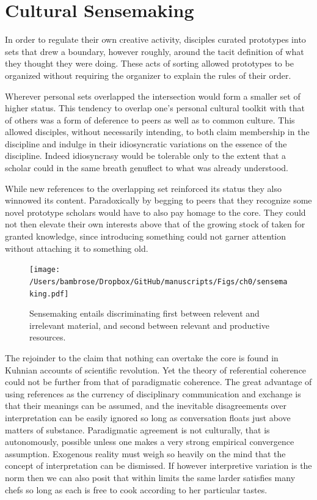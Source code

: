 \documentclass[]{article}
\begin{document}
\section{Cultural Sensemaking}\label{cultural-sensemaking}

In order to regulate their own creative activity, disciples curated
prototypes into sets that drew a boundary, however roughly, around the
tacit definition of what they thought they were doing. These acts of
sorting allowed prototypes to be organized without requiring the
organizer to explain the rules of their order.

Wherever personal sets overlapped the intersection would form a smaller
set of higher status. This tendency to overlap one's personal cultural
toolkit with that of others was a form of deference to peers as well as
to common culture. This allowed disciples, without necessarily
intending, to both claim membership in the discipline and indulge in
their idiosyncratic variations on the essence of the discipline. Indeed
idiosyncrasy would be tolerable only to the extent that a scholar could
in the same breath genuflect to what was already understood.

While new references to the overlapping set reinforced its status they
also winnowed its content. Paradoxically by begging to peers that they
recognize some novel prototype scholars would have to also pay homage to
the core. They could not then elevate their own interests above that of
the growing stock of taken for granted knowledge, since introducing
something could not garner attention without attaching it to something
old.

\begin{figure}[htbp]
\centering
\texttt{[image: /Users/bambrose/Dropbox/GitHub/manuscripts/Figs/ch0/sensemaking.pdf]}
\caption{Sensemaking entails discriminating first between relevent and
irrelevant material, and second between relevant and productive
resources.}
\end{figure}

The rejoinder to the claim that nothing can overtake the core is found
in Kuhnian accounts of scientific revolution. Yet the theory of
referential coherence could not be further from that of paradigmatic
coherence. The great advantage of using references as the currency of
disciplinary communication and exchange is that their meanings can be
assumed, and the inevitable disagreements over interpretation can be
easily ignored so long as conversation floats just above matters of
substance. Paradigmatic agreement is not culturally, that is
autonomously, possible unless one makes a very strong empirical
convergence assumption. Exogenous reality must weigh so heavily on the
mind that the concept of interpretation can be dismissed. If however
interpretive variation is the norm then we can also posit that within
limits the same larder satisfies many chefs so long as each is free to
cook according to her particular tastes.
\end{document}
